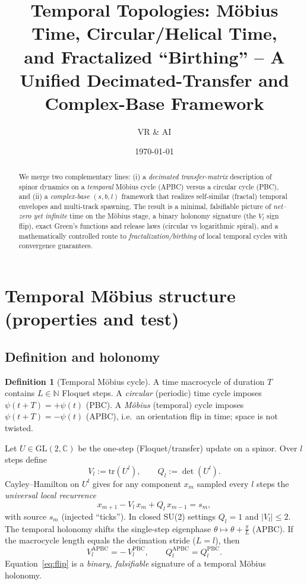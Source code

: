 \documentclass[11pt]{article}
\title{\textbf{Temporal Topologies: M\"obius Time, Circular/Helical Time,\\
and Fractalized ``Birthing'' -- A Unified Decimated-Transfer and Complex-Base Framework}}
\author{VR \& AI}
\date{\today}
\theoremstyle{definition}
\newtheorem{definition}[theorem]{Definition}
\theoremstyle{remark}
\newcommand{\N}{\mathbb{N}}
\newcommand{\C}{\mathbb{C}}
\newcommand{\tr}{\mathrm{tr}}
\begin{document}
\maketitle

\begin{abstract}
We merge two complementary lines: (i) a \emph{decimated transfer-matrix} description of spinor dynamics on a \emph{temporal} M\"obius cycle (APBC) versus a circular cycle (PBC), and (ii) a \emph{complex-base} $(s,b,l)$ framework that realizes self-similar (fractal) temporal envelopes and multi-track spawning.
The result is a minimal, falsifiable picture of \emph{net--zero yet infinite} time on the M\"obius stage, a binary holonomy signature (the $V_l$ sign flip), exact Green's functions and release laws (circular vs logarithmic spiral), and a mathematically controlled route to \emph{fractalization/birthing} of local temporal cycles with convergence guarantees.
\end{abstract}

\section{Temporal M\"obius structure (properties and test)}
\subsection{Definition and holonomy}
\begin{definition}[Temporal M\"obius cycle]
A time macrocycle of duration $T$ contains $L\in\N$ Floquet steps.
A \emph{circular} (periodic) time cycle imposes $\psi(t{+}T)=+\psi(t)$ (PBC). A \emph{M\"obius} (temporal) cycle imposes $\psi(t{+}T)=-\psi(t)$ (APBC), i.e.\ an orientation flip in time; space is not twisted.
\end{definition}

Let $U\in \mathrm{GL}(2,\C)$ be the one-step (Floquet/transfer) update on a spinor. Over $l$ steps define
\begin{equation}
V_l:=\tr(U^l),\qquad Q_l:=\det(U^l).
\end{equation}
Cayley--Hamilton on $U^l$ gives for any component $x_m$ sampled every $l$ steps the \emph{universal local recurrence}
\begin{equation}\label{eq:R}
x_{m+1}-V_l\,x_m+Q_l\,x_{m-1}=s_m,
\end{equation}
with source $s_m$ (injected ``ticks''). In closed SU(2) settings $Q_l=1$ and $|V_l|\le 2$.
The temporal holonomy shifts the single-step eigenphase $\theta\mapsto \theta+\frac{\pi}{L}$ (APBC). If the macrocycle length equals the decimation stride ($L=l$), then
\begin{equation}\label{eq:flip}
\boxed{~V_l^{\mathrm{APBC}}=-\,V_l^{\mathrm{PBC}},\qquad Q_l^{\mathrm{APBC}}=Q_l^{\mathrm{PBC}}.~}
\end{equation}
Equation~\eqref{eq:flip} is a \emph{binary, falsifiable} signature of a temporal M\"obius holonomy.
\end{document}
